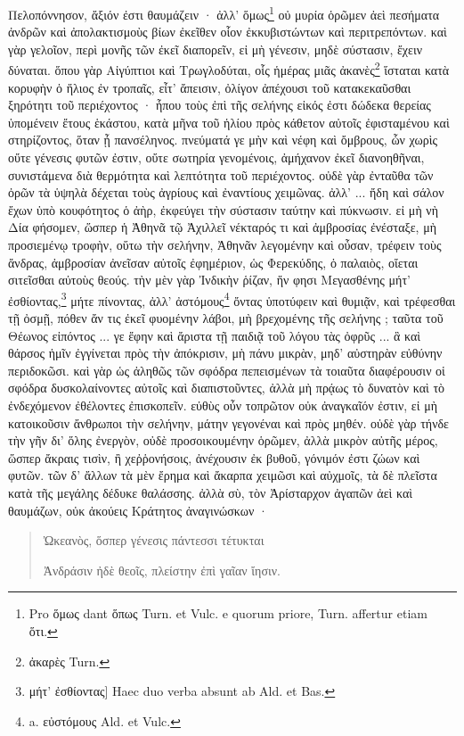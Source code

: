 \documentclass[a4paper, 11pt, oneside, polutonikogreek, german]{article}
\begin{document}
Πελοπόννησον, ἄξιόν ἐστι θαυμάζειν · ἀλλ' ὅμως\footnote{Pro ὅμως dant ὅπως Turn. et Vulc. e quorum priore, Turn. affertur etiam ὅτι.} οὐ μυρία ὁρῶμεν ἀεὶ πεσήματα ἀνδρῶν καὶ ἀπολακτισμοὺς βίων ἐκεῖθεν οἷον ἐκκυβιστώντων καὶ περιτρεπόντων. καὶ γὰρ γελοῖον, περὶ μονῆς τῶν ἐκεῖ διαπορεῖν, εἰ μὴ γένεσιν, μηδὲ σύστασιν, ἔχειν δύναται. ὅπου γὰρ Αἰγύπτιοι καὶ Τρωγλοδύται, οἷς ἡμέρας μιᾶς ἀκανὲς\footnote{ἀκαρὲς Turn.} ἵσταται κατὰ κορυφὴν ὁ ἥλιος ἐν τροπαῖς, εἶτ' ἄπεισιν, ὀλίγον ἀπέχουσι τοῦ κατακεκαῦσθαι ξηρότητι τοῦ περιέχοντος · ἦπου τοὺς ἐπὶ τῆς σελήνης εἰκός ἐστι δώδεκα θερείας ὑπομένειν ἔτους ἑκάστου, κατὰ μῆνα τοῦ ἡλίου πρὸς κάθετον αὐτοῖς ἐφισταμένου καὶ στηρίζοντος, ὅταν ᾖ πανσέληνος. πνεύματά γε μὴν καὶ νέφη καὶ ὄμβρους, ὧν χωρὶς οὔτε γένεσις φυτῶν ἐστιν, οὔτε σωτηρία γενομένοις, ἀμήχανον ἐκεῖ διανοηθῆναι, συνιστάμενα διὰ θερμότητα καὶ λεπτότητα τοῦ περιέχοντος. οὐδὲ γὰρ ἐνταῦθα τῶν ὀρῶν τὰ ὑψηλὰ δέχεται τοὺς ἀγρίους καὶ ἐναντίους χειμῶνας. ἀλλ' ... ἤδη καὶ σάλον ἔχων ὑπὸ κουφότητος ὁ ἀὴρ, ἐκφεύγει τὴν σύστασιν ταύτην καὶ πύκνωσιν. εἰ μὴ νὴ Δία φήσομεν, ὥσπερ ἡ Ἀθηνᾶ τῷ Ἀχιλλεῖ νέκταρός τι καὶ ἀμβροσίας ἐνέσταξε, μὴ προσιεμένῳ τροφὴν, οὕτω τὴν σελήνην, Ἀθηνᾶν λεγομένην καὶ οὖσαν, τρέφειν τοὺς ἄνδρας, ἀμβροσίαν ἀνεῖσαν αὐτοῖς ἐφημέριον, ὡς Φερεκύδης, ὁ παλαιὸς, οἴεται σιτεῖσθαι αὐτοὺς θεούς. τὴν μὲν γὰρ Ἰνδικὴν ῥίζαν, ἥν φησι Μεγασθένης μήτ' ἐσθίοντας,\footnote{μήτ' ἐσθίοντας] Haec duo verba absunt ab Ald. et Bas.} μήτε πίνοντας, ἀλλ' ἀστόμους\footnote{a. εὐστόμους Ald. et Vulc.} ὄντας ὑποτύφειν καὶ θυμιᾷν, καὶ τρέφεσθαι τῇ ὀσμῇ, πόθεν ἄν τις ἐκεῖ φυομένην λάβοι, μὴ βρεχομένης τῆς σελήνης ; ταῦτα τοῦ Θέωνος εἰπόντος ... γε ἔφην καὶ ἄριστα τῇ παιδιᾷ τοῦ λόγου τὰς ὀφρῦς ... ἃ καὶ θάρσος ἡμῖν ἐγγίνεται πρὸς τὴν ἀπόκρισιν, μὴ πάνυ μικρὰν, μηδ' αὐστηρὰν εὐθύνην περιδοκῶσι. καὶ γὰρ ὡς ἀληθῶς τῶν σφόδρα πεπεισμένων τὰ τοιαῦτα διαφέρουσιν οἱ σφόδρα δυσκολαίνοντες αὐτοῖς καὶ διαπιστοῦντες, ἀλλὰ μὴ πρᾴως τὸ δυνατὸν καὶ τὸ ἐνδεχόμενον ἐθέλοντες ἐπισκοπεῖν. εὐθὺς οὖν τοπρῶτον οὐκ ἀναγκαῖόν ἐστιν, εἰ μὴ κατοικοῦσιν ἄνθρωποι τὴν σελήνην, μάτην γεγονέναι καὶ πρὸς μηθέν. οὐδὲ γὰρ τήνδε τὴν γῆν δι' ὅλης ἐνεργὸν, οὐδὲ προσοικουμένην ὁρῶμεν, ἀλλὰ μικρὸν αὐτῆς μέρος, ὥσπερ ἄκραις τισὶν, ἢ χεῤῥονήσοις, ἀνέχουσιν ἐκ βυθοῦ, γόνιμόν ἐστι ζώων καὶ φυτῶν. τῶν δ' ἄλλων τὰ μὲν ἔρημα καὶ ἄκαρπα χειμῶσι καὶ αὐχμοῖς, τὰ δὲ πλεῖστα κατὰ τῆς μεγάλης δέδυκε θαλάσσης. ἀλλὰ σὺ, τὸν Ἀρίσταρχον ἀγαπῶν ἀεὶ καὶ θαυμάζων, οὐκ ἀκούεις Κράτητος ἀναγινώσκων ·
\begin{quotation}
Ὠκεανὸς, ὅσπερ γένεσις πάντεσσι τέτυκται

Ἀνδράσιν ἠδὲ θεοῖς, πλείστην ἐπὶ γαῖαν ἴησιν.
\end{quotation}
\end{document}
